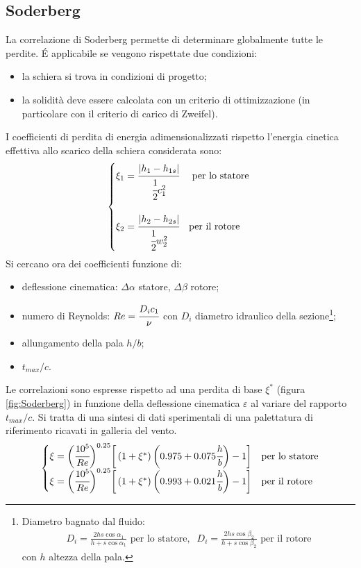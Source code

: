 \subsection{Soderberg}
La correlazione di Soderberg permette di determinare globalmente tutte le perdite. \'E applicabile se vengono rispettate due condizioni:
\begin{itemize}
	\item la schiera si trova in condizioni di progetto;
	\item la solidità deve essere calcolata con un criterio di ottimizzazione (in particolare con il criterio di carico di Zweifel).
\end{itemize}
I coefficienti di perdita di energia adimensionalizzati rispetto l'energia cinetica effettiva allo scarico della schiera considerata sono:
\begin{align*}
\begin{cases}
\xi_1 = \cfrac{|h_1 - h_{1s}|}{\cfrac{1}{2} c_1^2} & \mbox{ per lo statore }\\
\\
\xi_2 = \cfrac{|h_2 - h_{2s}|}{\cfrac{1}{2} w_2^2} & \mbox{per il rotore }
\end{cases}
\end{align*}
Si cercano ora dei coefficienti funzione di:
\begin{itemize}
\item deflessione cinematica: $\Delta \alpha$ statore, $\Delta \beta$ rotore;
\item numero di Reynolds: $Re = \cfrac{D_i c_1 }{\nu}$
con $D_i$ diametro idraulico della sezione\footnote{ Diametro bagnato dal fluido: \begin{align*}
D_{i} = \frac{2 h s \cos \alpha_1}{h + s \cos \alpha_1} \mbox{ per lo statore}, \;\; D_{i} = \frac{2 h s \cos \beta_2}{h + s \cos \beta_2} \mbox{ per il rotore}
\end{align*} con $h$ altezza della pala.};
\item allungamento della pala $h/b$;
\item $t_{max}/c$.
\end{itemize}
Le correlazioni sono espresse rispetto ad una perdita di base $\xi^*$ (figura \ref{fig:Soderberg}) in funzione della deflessione cinematica $\varepsilon$ al variare del rapporto $t_{max}/c$. Si tratta di una sintesi di dati sperimentali di una palettatura di riferimento ricavati in galleria del vento.
\begin{align*}
\begin{cases}
\xi = \bigg( \cfrac{10^5}{Re} \bigg)^{0.25} \bigg[ \left( 1 + \xi^* \right) \bigg ( 0.975 + 0.075 \cfrac{h}{b} \bigg) -1 \bigg] & \mbox{per lo statore} \\
\xi = \bigg( \cfrac{10^5}{Re} \bigg)^{0.25} \bigg[ \left( 1 + \xi^* \right) \bigg ( 0.993 + 0.021 \cfrac{h}{b} \bigg) -1 \bigg] & \mbox{per il rotore}
\end{cases}
\end{align*}
